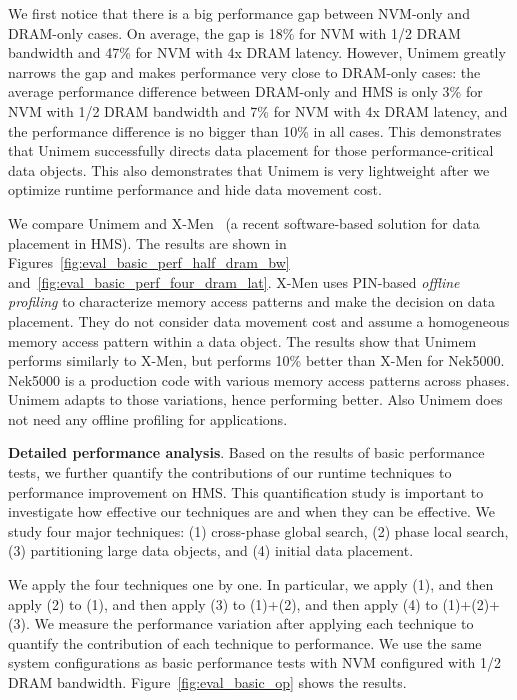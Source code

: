 We first notice that there is a big performance gap between NVM-only
and DRAM-only cases. On average, the gap is 18\% for NVM with 1/2 DRAM bandwidth and 47\% for NVM with 4x DRAM latency. %
However, Unimem greatly narrows the gap and makes performance very
close to DRAM-only cases: the average performance difference between DRAM-only and HMS is only 3\% for NVM with 1/2 DRAM bandwidth and 7\% for NVM with 4x DRAM latency, and the performance difference is no bigger than 10\%
in all cases. This demonstrates that Unimem successfully directs
data placement for those performance-critical data objects.
This also demonstrates that Unimem is very lightweight
after we optimize runtime performance and hide data movement cost.

We compare Unimem and X-Men~\cite{eurosys16:dulloor} (a recent software-based solution for data placement in HMS). The results are shown in Figures~\ref{fig:eval_basic_perf_half_dram_bw} and~\ref{fig:eval_basic_perf_four_dram_lat}. 
X-Men uses PIN-based \textit{offline profiling} to characterize memory access patterns and make the decision on data placement. They do not consider data movement cost and assume a homogeneous memory access pattern within a data object. %
The results show that Unimem performs similarly to X-Men, but performs 10\%
better than X-Men for Nek5000. Nek5000 is a production code with various memory
access patterns across phases. Unimem adapts to those variations, hence performing better. Also Unimem does not need any offline profiling for applications.

\textbf{Detailed performance analysis}. Based on the results of basic performance tests,  we further quantify the contributions of our runtime techniques to performance improvement on HMS. This quantification study
is important to investigate how effective our techniques are and when
they can be effective.
We study four major techniques: (1) cross-phase global search,
(2) phase local search, 
(3) partitioning large data objects, 
and (4) initial data placement. 

We apply the four techniques one by one. In particular, we apply (1),
and then apply (2) to (1), and then apply (3) to (1)+(2), and then apply (4) to (1)+(2)+(3). We measure the performance variation after
applying each technique to quantify the contribution of each technique
to performance. 
We use the same system configurations as basic performance tests with NVM 
configured with 1/2 DRAM bandwidth.
Figure~\ref{fig:eval_basic_op} shows the results.

